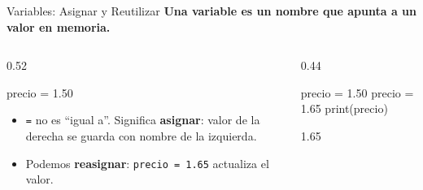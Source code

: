 \documentclass[aspectratio=169, 11pt]{beamer}
\begin{document}
\begin{frame}[fragile]{Variables: Asignar y Reutilizar}
  \vspace{-6pt}
  {\small\color{arcaDark}\bfseries
    Una variable es un nombre que apunta a un valor en memoria.}

  \vspace{3pt}
  \begin{columns}[T]
    \begin{column}{0.52\textwidth}
      \begin{pyblock}
precio = 1.50
      \end{pyblock}

      \vspace{1pt}
      {\footnotesize
      }

      \vspace{1pt}
      {\scriptsize\color{textMuted}
      \begin{itemize}\setlength{\itemsep}{1pt}
        \item[{\color{arcaRed}\scriptsize\faArrowRight}]
          \texttt{=} no es ``igual a''.
          Significa \textbf{asignar}: valor de la
          derecha se guarda con nombre de la izquierda.
        \item[{\color{arcaRed}\scriptsize\faArrowRight}]
          Podemos \textbf{reasignar}:
          \texttt{precio = 1.65} actualiza el valor.
      \end{itemize}
      }
    \end{column}

    \begin{column}{0.44\textwidth}
      \begin{pyblock}
precio = 1.50
precio = 1.65
print(precio)
      \end{pyblock}
      \vspace{-2pt}
      \begin{outputblock}
1.65
      \end{outputblock}


\end{column}
\end{columns}
\end{frame}
\end{document}
